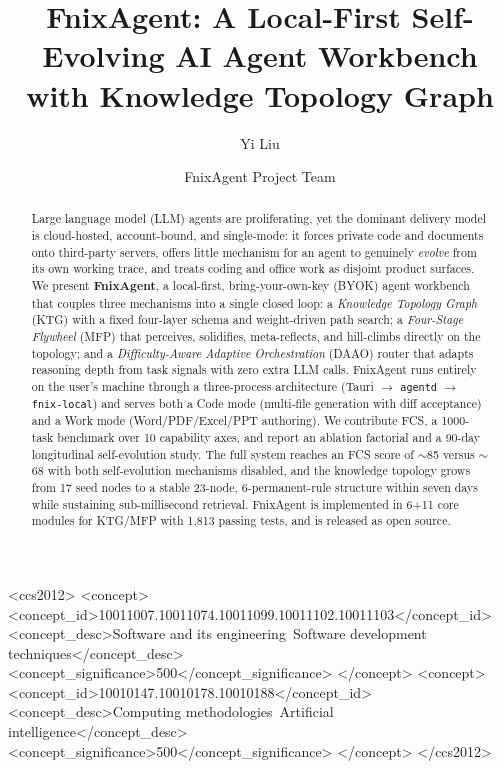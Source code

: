 \documentclass[sigconf]{acmart}
\begin{document}
\title{FnixAgent: A Local-First Self-Evolving AI Agent Workbench with Knowledge Topology Graph}

\author{Yi Liu}

\author{FnixAgent Project Team}

\renewcommand{\shortauthors}{Liu et al.}

\begin{abstract}
Large language model (LLM) agents are proliferating, yet the dominant delivery model is cloud-hosted, account-bound, and single-mode: it forces private code and documents onto third-party servers, offers little mechanism for an agent to genuinely \emph{evolve} from its own working trace, and treats coding and office work as disjoint product surfaces. We present \textbf{FnixAgent}, a local-first, bring-your-own-key (BYOK) agent workbench that couples three mechanisms into a single closed loop: a \emph{Knowledge Topology Graph} (KTG) with a fixed four-layer schema and weight-driven path search; a \emph{Four-Stage Flywheel} (MFP) that perceives, solidifies, meta-reflects, and hill-climbs directly on the topology; and a \emph{Difficulty-Aware Adaptive Orchestration} (DAAO) router that adapts reasoning depth from task signals with zero extra LLM calls. FnixAgent runs entirely on the user's machine through a three-process architecture (Tauri $\rightarrow$ \texttt{agentd} $\rightarrow$ \texttt{fnix-local}) and serves both a Code mode (multi-file generation with diff acceptance) and a Work mode (Word/PDF/Excel/PPT authoring). We contribute FCS, a 1000-task benchmark over 10 capability axes, and report an ablation factorial and a 90-day longitudinal self-evolution study. The full system reaches an FCS score of $\sim$85 versus $\sim$68 with both self-evolution mechanisms disabled, and the knowledge topology grows from 17 seed nodes to a stable 23-node, 6-permanent-rule structure within seven days while sustaining sub-millisecond retrieval. FnixAgent is implemented in 6+11 core modules for KTG/MFP with 1{,}813 passing tests, and is released as open source.
\end{abstract}

\begin{CCSXML}
<ccs2012>
  <concept>
    <concept_id>10011007.10011074.10011099.10011102.10011103</concept_id>
    <concept_desc>Software and its engineering~Software development techniques</concept_desc>
    <concept_significance>500</concept_significance>
  </concept>
  <concept>
    <concept_id>10010147.10010178.10010188</concept_id>
    <concept_desc>Computing methodologies~Artificial intelligence</concept_desc>
    <concept_significance>500</concept_significance>
  </concept>
</ccs2012>
\end{CCSXML}
\end{document}
